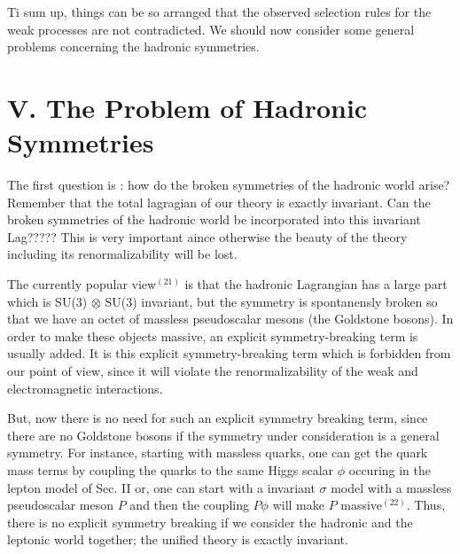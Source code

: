 Ti sum up, things can be so arranged that the observed selection rules for the weak processes are not contradicted. We should now consider some general problems concerning the hadronic symmetries. 

\section*{V. The Problem of Hadronic Symmetries}

The first question is : how do the broken symmetries of the hadronic world arise? Remember that the total lagragian of our theory is exactly invariant. Can the broken symmetries of the hadronic world be incorporated into this invariant Lag????? This is very important aince otherwise the beauty of the theory including its renormalizability will be lost.

The currently popular view$^{(21)}$ is that the hadronic Lagrangian has a large part which is SU(3) $\otimes$ SU(3) invariant, but the symmetry is spontanensly broken so that we have an octet of massless pseudoscalar mesons (the Goldstone bosons). In order to make these objects massive, an explicit symmetry-breaking term is usually added. It is this explicit symmetry-breaking term which is forbidden from our point of view, since it will violate the renormalizability of the weak and electromagnetic interactions.

\newpage

But, now there is no need for such an explicit symmetry breaking term, since there are no Goldstone bosons if the symmetry under consideration is a general symmetry. For instance, starting with massless quarks, one can get the quark mass terms by coupling the quarks to the same Higgs scalar $\phi$ occuring in the lepton model of Sec. II or, one can start with a invariant $\sigma$ model with a massless pseudoscalar meson $P$ and then the coupling $P \phi$ will make $P$ massive$^{(22)}$. Thus, there is no explicit symmetry breaking if we consider the hadronic and the leptonic world together; the unified theory is exactly invariant.

